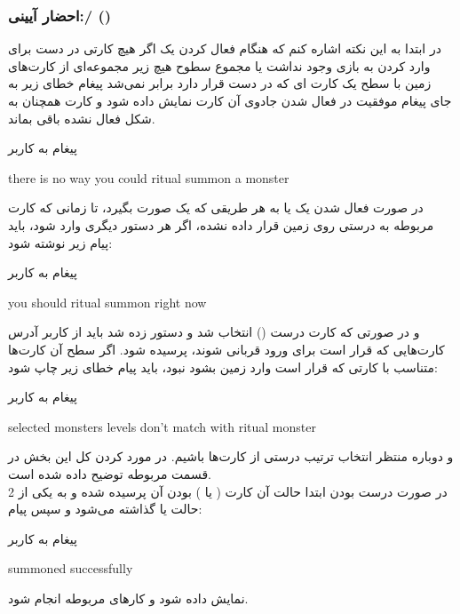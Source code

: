 \documentclass[]{article}
\begin{document}
\subsubsection*{{\titr احضار آیینی:/ ()}}
در ابتدا به این نکته اشاره کنم که هنگام فعال کردن یک  اگر 
هیچ  کارتی در دست برای وارد کردن به بازی وجود نداشت یا مجموع 
سطوح 
هیچ زیر مجموعه‌ای از کارت‌های زمین با سطح یک کارت  ای که 
در 
دست قرار دارد برابر نمی‌شد پیغام خطای زیر به جای پیغام موفقیت در فعال شدن 
جادوی آن کارت نمایش داده شود و کارت همچنان به شکل فعال نشده باقی بماند.
\begin{mybox}[colback=yellow]{پیغام به کاربر}
	\begin{latin}	
		there is no way you could ritual summon a monster
	\end{latin}
\end{mybox}
در صورت فعال شدن یک  یا به هر طریقی که یک  
صورت بگیرد، تا زمانی که کارت مربوطه به درستی روی زمین قرار داده نشده، اگر 
هر دستور دیگری وارد شود، باید پیام زیر نوشته شود:
\begin{mybox}[colback=yellow]{پیغام به کاربر}
	\begin{latin}	
	    you should ritual summon right now	
	\end{latin}
\end{mybox}
و در صورتی که کارت درست () انتخاب شد و دستور  
زده شد باید از کاربر آدرس کارت‌هایی که قرار است برای ورود  قربانی 
شوند، پرسیده شود. اگر سطح آن‌ کارت‌ها متناسب با کارتی که قرار است وارد زمین 
بشود نبود، باید پیام خطای زیر چاپ شود:
\begin{mybox}[colback=yellow]{پیغام به کاربر}
	\begin{latin}	
		selected monsters levels don’t match with ritual monster
	\end{latin}
\end{mybox}
و دوباره منتظر انتخاب ترتیب درستی از کارت‌ها باشیم. در مورد  کردن 
کل این بخش در قسمت مربوطه توضیح داده شده است.
\\
در صورت درست بودن  ابتدا حالت آن کارت ( یا 
) بودن آن پرسیده شده و به یکی از 2 حالت  یا  
گذاشته می‌شود و سپس پیام:
\begin{mybox}[colback=yellow]{پیغام به کاربر}
	\begin{latin}	
	    summoned successfully	
	\end{latin}
\end{mybox}
    نمایش داده شود و کارهای مربوطه انجام شود.
\end{document}
